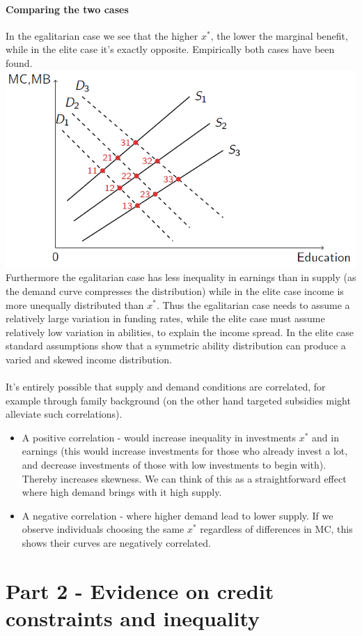 \documentclass[12pt, a4paper]{article}
\begin{document}
\begin{multicols}{2}
\paragraph{Comparing the two cases}
In the egalitarian case we see that the higher $x^*$, the lower the marginal benefit, while in the elite case it's exactly opposite. Empirically both cases have been found.
\includegraphics[width = 0.45 \textwidth]{comp.PNG}
Furthermore the egalitarian case has less inequality in earnings than in supply (as the demand curve compresses the distribution) while in the elite case income is more unequally distributed than $x^*$. Thus the egalitarian case needs to assume a relatively large variation in funding rates, while the elite case must assume relatively low variation in abilities, to explain the income spread. In the elite case standard assumptions show that a symmetric ability distribution can produce a varied and skewed income distribution.
\\ \\
It's entirely possible that supply and demand conditions are correlated, for example through family background (on the other hand targeted subsidies might alleviate such correlations).
\begin{itemize}
\item A positive correlation - would increase inequality in investments $x^*$ and in earnings (this would increase investments for those who already invest a lot, and decrease investments of those with low investments to begin with). Thereby increases skewness. We can think of this as a straightforward effect where high demand brings with it high supply.
\item A negative correlation - where higher demand lead to lower supply. If we observe individuals choosing the same $x^*$ regardless of differences in MC, this shows their curves are negatively correlated.
\end{itemize}

\section{Part 2 - Evidence on credit constraints and inequality}

\end{multicols}
\end{document}
